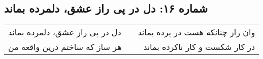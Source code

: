 \begin{center}
\section*{شماره ۱۶: دل در پی راز عشق، دلمرده بماند}
\label{sec:016}
\begin{longtable}{l p{0.5cm} r}
دل در پی راز عشق، دلمرده بماند
&&
وان راز چنانکه هست در پرده بماند
\\
هر ساز که ساختم درین واقعه من
&&
در کار شکست و کار ناکرده بماند
\\
\end{longtable}
\end{center}
